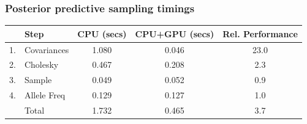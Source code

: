 \documentclass[t]{beamer}\usepackage[]{graphicx}\usepackage[]{color}
\begin{document}
\begin{frame}
\frametitle{Posterior predictive sampling timings}




\vspace{-7mm}

\begin{center}
\renewcommand*{\arraystretch}{1.5}
\begin{tabular}{rl|c|c|c}
& Step                                    & CPU (secs)  & CPU+GPU (secs)  & Rel. Performance \\
\hline
1. & Covariances                          & 1.080       & 0.046           & 23.0 \\
2. & Cholesky                             & 0.467       & 0.208           & 2.3 \\
3. & Sample                               & 0.049       & 0.052           & 0.9 \\
4. & Allele Freq                          & 0.129       & 0.127           & 1.0 \\
\hline 
   & Total                                & 1.732       & 0.465           & 3.7 \\
\end{tabular}

\end{center}

\vspace{3mm}
\end{frame}
\end{document}
